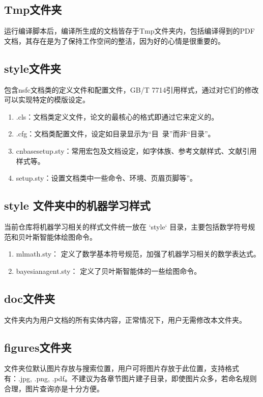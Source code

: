 \subsection{Tmp文件夹}

运行编译脚本后，编译所生成的文档皆存于Tmp文件夹内，包括编译得到的PDF文档，其存在是为了保持工作空间的整洁，因为好的心情是很重要的。

\subsection{style文件夹}

包含nsfc文档类的定义文件和配置文件，GB/T 7714引用样式，通过对它们的修改可以实现特定的模版设定。

\begin{enumerate}
    \item \projectname.cls：文档类定义文件，论文的最核心的格式即通过它来定义的。
    \item \projectname.cfg：文档类配置文件，设定如目录显示为“目~录”而非“目录”。
    \item cnbasesetup.sty：常用宏包及文档设定，如字体族、参考文献样式、文献引用样式等。
    \item \projectname setup.sty：设置文档类中一些命令、环境、页眉页脚等”。
\end{enumerate}

\subsection{style 文件夹中的机器学习样式}
当前仓库将机器学习相关的样式文件统一放在 `style` 目录，主要包括数学符号规范和贝叶斯智能体绘图命令。
\begin{enumerate}
    \item mlmath.sty： 定义了数学基本符号规范，加强了机器学习相关的数学表达式。
    \item bayesianagent.sty： 定义了贝叶斯智能体的一些绘图命令。
\end{enumerate}

\subsection{doc文件夹}
文件夹内为用户文档的所有实体内容，正常情况下，用户无需修改本文件夹。


\subsection{figures文件夹}
文件夹位默认图片存放与搜索位置，用户可将图片存放于此位置，支持格式有：.jpg, .png, .pdf。不建议为各章节图片建子目录，即使图片众多，若命名规则合理，图片查询亦是十分方便。

